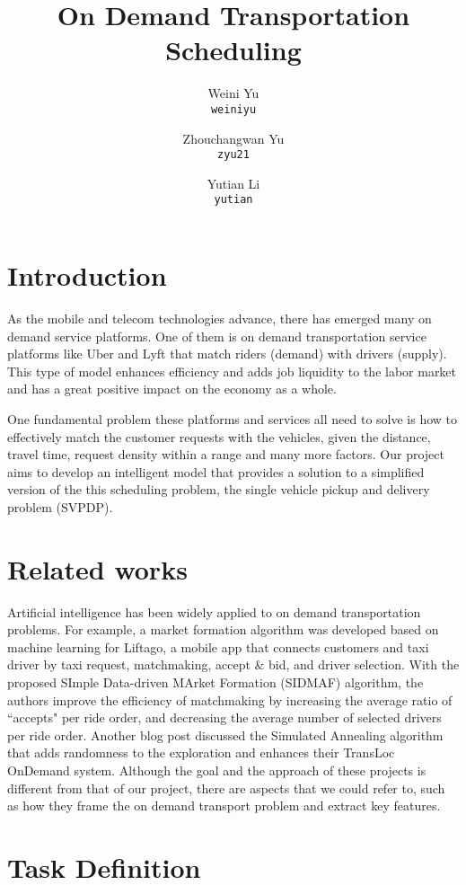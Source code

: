 \documentclass{article}
\title{On Demand Transportation Scheduling}
\author{Weini Yu\\\texttt{weiniyu}\and Zhouchangwan Yu\\\texttt{zyu21}\and Yutian Li\\\texttt{yutian}}
\begin{document}
\maketitle

\section{Introduction}

As the mobile and telecom technologies advance, there has emerged many on demand service platforms. One of them is on demand transportation service platforms like Uber and Lyft that match riders (demand) with drivers (supply). This type of model enhances efficiency and adds job liquidity to the labor market and has a great positive impact on the economy as a whole.

One fundamental problem these platforms and services all need to solve is how to effectively match the customer requests with the vehicles, given the distance, travel time, request density within a range and many more factors. Our project aims to develop an intelligent model that provides a solution to a simplified version of the this scheduling problem, the single vehicle pickup and delivery problem (SVPDP)\cite{SVPDP}.

\section{Related works}

Artificial intelligence has been widely applied to on demand transportation problems. For example, a market formation algorithm was developed based on machine learning for Liftago, a mobile app that connects customers and taxi driver by taxi request, matchmaking, accept \& bid, and driver selection\cite{Liftago}. With the proposed SImple Data-driven MArket Formation (SIDMAF) algorithm, the authors improve the efficiency of matchmaking by increasing the average ratio of ``accepts" per ride order, and decreasing the average number of selected drivers per ride order. Another blog post discussed the Simulated Annealing algorithm that adds randomness to the exploration and enhances their TransLoc OnDemand system\cite{TransLoc}. Although the goal and the approach of these projects is different from that of our project, there are aspects that we could refer to, such as how they frame the on demand transport problem and extract key features.

\section{Task Definition}
\end{document}
